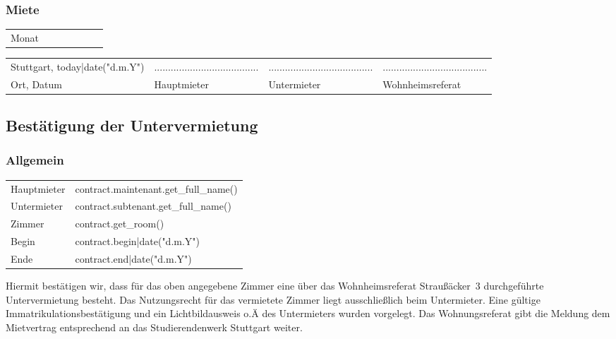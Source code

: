 \documentclass[9pt,pdftex,a4paper]{article}
\newcommand{\signLine}{......................................}
\begin{document}
\subsubsection*{Miete}
{%
\begin{tabularx}{\textwidth}{lXXXXXX}
Monat {%
Miete {%
\end{tabularx}
{%

\vfill

\begin{tabularx}{\textwidth}{@{}YYYY@{}}
Stuttgart, {{ today|date("d.m.Y") }} & \signLine & \signLine & \signLine\\
Ort, Datum &  Hauptmieter& Untermieter & Wohnheimsreferat\\
\end{tabularx}

%
%

\newpage

\subsection*{Bestätigung der Untervermietung}

\subsubsection*{Allgemein}
\begin{tabularx}{\textwidth}{XX}
Hauptmieter & {{ contract.maintenant.get_full_name() }}\\
Untermieter &  {{ contract.subtenant.get_full_name() }}\\
Zimmer & {{ contract.get_room() }}\\
Begin & {{ contract.begin|date("d.m.Y") }}\\
Ende & {{ contract.end|date("d.m.Y") }}\\
\end{tabularx}\bigskip

Hiermit bestätigen wir, dass für das oben angegebene Zimmer eine über das Wohnheimsreferat Straußäcker~3 durchgeführte Untervermietung besteht.
Das Nutzungsrecht für das vermietete Zimmer liegt ausschließlich beim Untermieter.
Eine gültige Immatrikulationsbestätigung und ein Lichtbildausweis o.Ä des Untermieters wurden vorgelegt.
Das Wohnungsreferat gibt die Meldung dem Mietvertrag entsprechend an das Studierendenwerk Stuttgart weiter.\bigskip


}}
\end{document}
